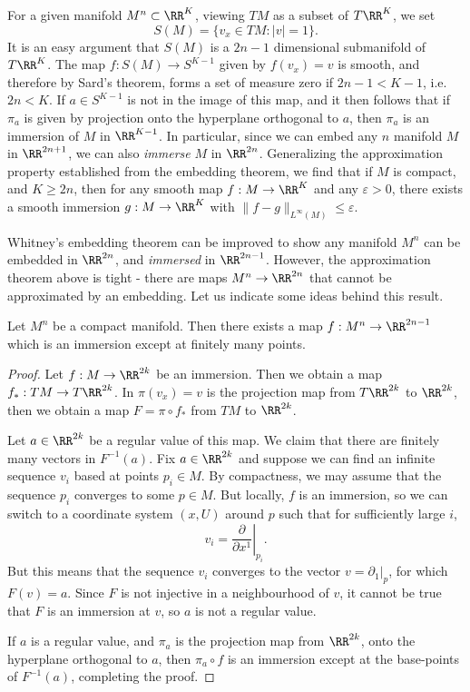 \begin{remark}
    For a given manifold $M^n \subset \RR^K$, viewing $TM$ as a subset of $T\RR^K$, we set
    \[ S(M) = \{ v_x \in TM : |v| = 1 \}. \]
    It is an easy argument that $S(M)$ is a $2n - 1$ dimensional submanifold of $T\RR^K$. The map $f: S(M) \to S^{K-1}$ given by $f(v_x) = v$ is smooth, and therefore by Sard's theorem, forms a set of measure zero if $2n - 1 < K - 1$, i.e. $2n < K$. If $a \in S^{K-1}$ is not in the image of this map, and it then follows that if $\pi_a$ is given by projection onto the hyperplane orthogonal to $a$, then $\pi_a$ is an immersion of $M$ in $\RR^{K-1}$. In particular, since we can embed any $n$ manifold $M$ in $\RR^{2n+1}$, we can also \emph{immerse} $M$ in $\RR^{2n}$. Generalizing the approximation property established from the embedding theorem, we find that if $M$ is compact, and $K \geq 2n$, then for any smooth map $f: M \to \RR^K$ and any $\varepsilon > 0$, there exists a smooth immersion $g: M \to \RR^K$ with $\| f - g \|_{L^\infty(M)} \leq \varepsilon$.
\end{remark}

Whitney's embedding theorem can be improved to show any manifold $M^n$ can be embedded in $\RR^{2n}$, and \emph{immersed} in $\RR^{2n-1}$. However, the approximation theorem above is tight - there are maps $M^n \to \RR^{2n}$ that cannot be approximated by an embedding. Let us indicate some ideas behind this result.

\begin{theorem}
    Let $M^n$ be a compact manifold. Then there exists a map $f: M^n \to \RR^{2n-1}$ which is an immersion except at finitely many points.
\end{theorem}
\begin{proof}
    Let $f: M \to \RR^{2k}$ be an immersion. Then we obtain a map $f_*: TM \to T\RR^{2k}$. In $\pi(v_x) = v$ is the projection map from $T\RR^{2k}$ to $\RR^{2k}$, then we obtain a map $F = \pi \circ f_*$ from $TM$ to $\RR^{2k}$.

    Let $a \in \RR^{2k}$ be a regular value of this map. We claim that there are finitely many vectors in $F^{-1}(a)$. Fix $a \in \RR^{2k}$ and suppose we can find an infinite sequence $v_i$ based at points $p_i \in M$. By compactness, we may assume that the sequence $p_i$ converges to some $p \in M$. But locally, $f$ is an immersion, so we can switch to a coordinate system $(x,U)$ around $p$ such that for sufficiently large $i$,
    \[ v_i = \left. \frac{\partial}{\partial x^1} \right|_{p_i}. \]
    But this means that the sequence $v_i$ converges to the vector $v = \partial_1|_p$, for which $F(v) = a$. Since $F$ is not injective in a neighbourhood of $v$, it cannot be true that $F$ is an immersion at $v$, so $a$ is not a regular value.

    If $a$ is a regular value, and $\pi_a$ is the projection map from $\RR^{2k}$, onto the hyperplane orthogonal to $a$, then $\pi_a \circ f$ is an immersion except at the base-points of $F^{-1}(a)$, completing the proof.
\end{proof}

